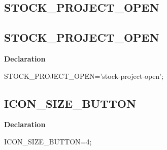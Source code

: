 \documentclass{report}
\newif\ifpdf
\begin{document}
\subsection*{\large{\textbf{STOCK{\_}PROJECT{\_}OPEN}}\normalsize\hspace{1ex}\hrulefill}
\else
\subsection*{STOCK{\_}PROJECT{\_}OPEN}
\fi
\label{licommon-STOCK_PROJECT_OPEN}
\begin{list}{}{
\setlength{\itemindent}{0cm}
\setlength{\listparindent}{0cm}
\setlength{\leftmargin}{\evensidemargin}
\addtolength{\leftmargin}{\tmplength}
\settowidth{\labelsep}{X}
\addtolength{\leftmargin}{\labelsep}
\setlength{\labelwidth}{\tmplength}
}
\item[\textbf{Declaration}\hfill]
\ifpdf
\begin{flushleft}
\fi
\begin{ttfamily}
STOCK{\_}PROJECT{\_}OPEN='stock-project-open';\end{ttfamily}

\ifpdf
\end{flushleft}
\fi

\end{list}
\ifpdf
\subsection*{\large{\textbf{ICON{\_}SIZE{\_}BUTTON}}\normalsize\hspace{1ex}\hrulefill}
\else
\subsection*{ICON{\_}SIZE{\_}BUTTON}
\fi
\label{licommon-ICON_SIZE_BUTTON}
\begin{list}{}{
\setlength{\itemindent}{0cm}
\setlength{\listparindent}{0cm}
\setlength{\leftmargin}{\evensidemargin}
\addtolength{\leftmargin}{\tmplength}
\settowidth{\labelsep}{X}
\addtolength{\leftmargin}{\labelsep}
\setlength{\labelwidth}{\tmplength}
}
\item[\textbf{Declaration}\hfill]
\ifpdf
\begin{flushleft}
\fi
\begin{ttfamily}
ICON{\_}SIZE{\_}BUTTON=4;\end{ttfamily}

\ifpdf
\end{flushleft}
\fi

\end{list}
\ifpdf
\end{document}
